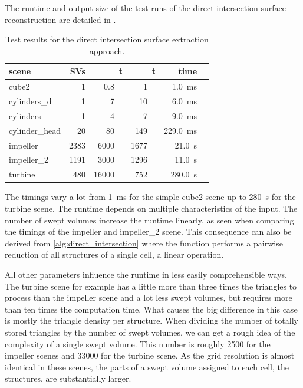 The runtime and output size of the test runs of the direct intersection surface reconstruction are detailed in .
%
\begin{table}
	\centering
	\begin{tabular}{lrrrrr}
		scene          & SVs  & t\sub{in} & t\sub{out} & {time} \\
		\midrule
		cube2          &    1 & \SI{  0.8}{\kilo\nothing} & \SI{   1}{\kilo\nothing} & \SI{  1.0}{\milli\second}            \\
		cylinders\_d   &    1 & \SI{    7}{\kilo\nothing} & \SI{  10}{\kilo\nothing} & \SI{  6.0}{\milli\second}            \\
		cylinders      &    1 & \SI{    4}{\kilo\nothing} & \SI{   7}{\kilo\nothing} & \SI{  9.0}{\milli\second}            \\
		cylinder\_head &   20 & \SI{   80}{\kilo\nothing} & \SI{ 149}{\kilo\nothing} & \SI{229.0}{\milli\second}            \\
		impeller       & 2383 & \SI{ 6000}{\kilo\nothing} & \SI{1677}{\kilo\nothing} & \SI{ 21.0}{      \second}\phantom{m} \\
		impeller\_2    & 1191 & \SI{ 3000}{\kilo\nothing} & \SI{1296}{\kilo\nothing} & \SI{ 11.0}{      \second}\phantom{m} \\
		turbine        &  480 & \SI{16000}{\kilo\nothing} & \SI{ 752}{\kilo\nothing} & \SI{280.0}{      \second}\phantom{m} \\
	\end{tabular}
	\caption{
		Test results for the direct intersection surface extraction approach.
	}
	\label{tbl:direct_intersection_results}
\end{table}
%
The timings vary a lot from \SI{1}{\milli\second} for the simple cube2 scene up to \SI{280}{\second} for the turbine scene.
The runtime depends on multiple characteristics of the input.
The number of swept volumes increase the runtime linearly, as seen when comparing the timings of the impeller and impeller\_2 scene.
This consequence can also be derived from \cref{alg:direct_intersection} where the  function performs a pairwise reduction of all structures of a single cell, a linear operation.

All other parameters influence the runtime in less easily comprehensible ways.
The turbine scene for example has a little more than three times the triangles to process than the impeller scene and a lot less swept volumes, but requires more than ten times the computation time.
What causes the big difference in this case is mostly the triangle density per structure.
When dividing the number of totally stored triangles by the number of swept volumes, we can get a rough idea of the complexity of a single swept volume.
This number is roughly 2500 for the impeller scenes and 33000 for the turbine scene.
As the grid resolution is almost identical in these scenes, the parts of a swept volume assigned to each cell, \ie the structures, are substantially larger.

